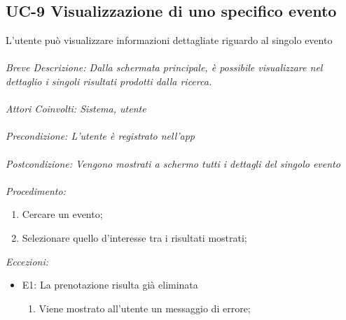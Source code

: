 \subsection{UC-9 Visualizzazione di uno specifico evento}
L'utente può visualizzare informazioni dettagliate riguardo al singolo evento
\\
\\
\textit{Breve Descrizione: Dalla schermata principale, è possibile visualizzare nel dettaglio i singoli risultati prodotti dalla ricerca.} 
\\
\\
\textit{Attori Coinvolti: Sistema, utente}
\\
\\
\textit{Precondizione: L'utente è registrato nell'app}
\\
\\
\textit{Postcondizione: Vengono mostrati a schermo tutti i dettagli del singolo evento}
\\
\\
\textit{Procedimento:}
\begin{enumerate}
	\item Cercare un evento;
	\item Selezionare quello d'interesse tra i risultati mostrati;
\end{enumerate}


\textit{Eccezioni:}
\begin{itemize}
	\item E1: La prenotazione risulta già eliminata
	\begin{enumerate}
		\item Viene mostrato all'utente un messaggio di errore;
	\end{enumerate}
\end{itemize}